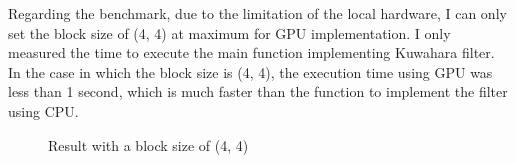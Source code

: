 \documentclass{article}
\begin{document}
Regarding the benchmark, due to the limitation of the local hardware, I can only set the block size of (4, 4) at maximum for GPU implementation. I only measured the time to execute the main function implementing Kuwahara filter. In the case in which the block size is (4, 4), the execution time using GPU was less than 1 second, which is much faster than the function to implement the filter using CPU. 

\begin{figure}[H]
    \caption{Result with a block size of (4, 4)}
\end{figure}
\end{document}
